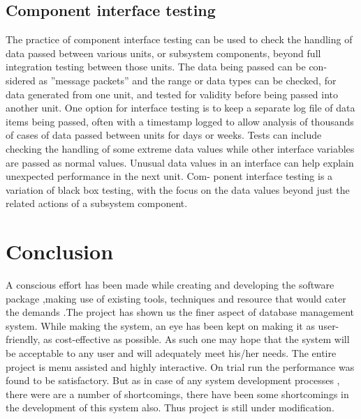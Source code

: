 \documentclass{article}
\begin{document}
\subsection{Component interface testing}
The practice of component interface testing can be used to check the handling of data passed between various units, or subsystem components, beyond full integration testing between those units. The data being passed can be con- sidered as ”message packets” and the range or data types can be checked, for data generated from one unit, and tested for validity before being passed into another unit. One option for interface testing is to keep a separate log file of data items being passed, often with a timestamp logged to allow analysis of thousands of cases of data passed between units for days or weeks. Tests can include checking the handling of some extreme data values while other interface variables are passed as normal values. Unusual data values in an interface can help explain unexpected performance in the next unit. Com- ponent interface testing is a variation of black box testing, with the focus on the data values beyond just the related actions of a subsystem component.

\newpage




\section{Conclusion}
\vspace{1em}
A conscious effort has been made while creating and developing the software package ,making use of existing tools, techniques and resource that would cater the demands .The project has shown us the finer aspect of database management system.
While making the system, an eye has been kept on making it as user-friendly, as cost-effective as possible. As such one may hope that the system will be acceptable to any user and will adequately meet his/her needs. The entire project is menu assisted and highly interactive. On trial run the performance was found to be satisfactory. But as in case of any system development processes , there were are a number of shortcomings, there have been some shortcomings in the development of this system also. Thus project is still under modification.
\end{document}
